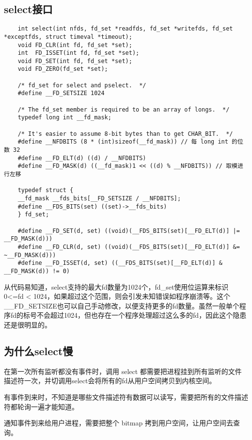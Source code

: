 \documentclass[a4paper,fontset=mac]{ctexart}
\begin{document}
	\subsection{select接口}
	\begin{lstlisting}
	int select(int nfds, fd_set *readfds, fd_set *writefds,	fd_set *exceptfds, struct timeval *timeout);
	void FD_CLR(int fd, fd_set *set);
	int  FD_ISSET(int fd, fd_set *set);
	void FD_SET(int fd, fd_set *set);
	void FD_ZERO(fd_set *set);
	
	/* fd_set for select and pselect.  */
	#define __FD_SETSIZE 1024
	
	/* The fd_set member is required to be an array of longs.  */
	typedef long int __fd_mask;
	
	/* It's easier to assume 8-bit bytes than to get CHAR_BIT.  */
	#define __NFDBITS (8 * (int)sizeof(__fd_mask)) // 每 long int 的位数 32
	#define __FD_ELT(d) ((d) / __NFDBITS)
	#define __FD_MASK(d) ((__fd_mask)1 << ((d) % __NFDBITS)) // 取模进行左移
	
	typedef struct {
	__fd_mask __fds_bits[__FD_SETSIZE / __NFDBITS];
	#define __FDS_BITS(set) ((set)->__fds_bits)
	} fd_set;
	
	#define __FD_SET(d, set) ((void)(__FDS_BITS(set)[__FD_ELT(d)] |= __FD_MASK(d)))
	#define __FD_CLR(d, set) ((void)(__FDS_BITS(set)[__FD_ELT(d)] &= ~__FD_MASK(d)))
	#define __FD_ISSET(d, set) ((__FDS_BITS(set)[__FD_ELT(d)] & __FD_MASK(d)) != 0)
	\end{lstlisting}
	从代码易知道，select支持的最大fd数量为{\color{red}1024}个，fd\_set使用位运算来标识 0<=fd < 1024，如果超过这个范围，则会引发未知错误如程序崩溃等。这个\_\_FD\_SETSIZE也可以自己手动修改，以便支持更多的fd数量。虽然一般单个程序fd的标号不会超过1024，但也存在一个程序处理超过这么多的fd，因此这个隐患还是很明显的。
	
	
	\subsection{为什么select慢}
	在第一次所有监听都没有事件时，调用 select 都需要把进程挂到所有监听的文件描述符一次，并切调用select会将所有的fd从用户空间拷贝到内核空间。
	
	有事件到来时，不知道是哪些文件描述符有数据可以读写，需要把所有的文件描述符都轮询一遍才能知道。
	
	通知事件到来给用户进程，需要把整个 bitmap 拷到用户空间，让用户空间去查询。
	
	
	
	
	
	
	
\end{document}
